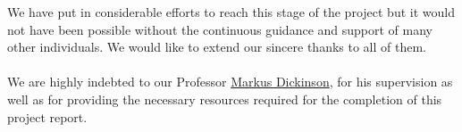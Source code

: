 \documentclass[fleqn,10pt]{SelfArx} %
\begin{document}
We have put in considerable efforts to reach this stage of the project but it would not have been possible without the continuous guidance and support of many other individuals. We would like to extend our sincere thanks to all of them.
\\ \\ We are highly indebted to our Professor \href{http://cl.indiana.edu/~md7/}{Markus Dickinson}, for his supervision as well as for providing the necessary resources required for the completion of this project report.

\newpage





\end{document}
